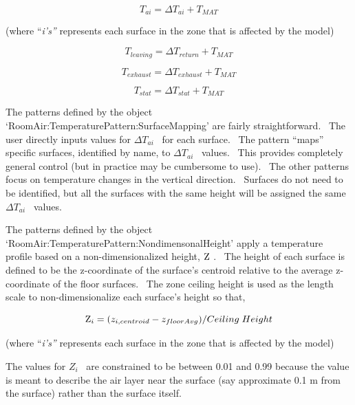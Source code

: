 \begin{equation}
{T_{ai}} = \Delta {T_{ai}} + {T_{MAT}}
\end{equation}

(where ``\emph{i's''} represents each surface in the zone that is affected by the model)

\begin{equation}
{T_{leaving}} = \Delta {T_{return}} + {T_{MAT}}
\end{equation}

\begin{equation}
{T_{exhaust}} = \Delta {T_{exhaust}} + {T_{MAT}}
\end{equation}

\begin{equation}
{T_{stat}} = \Delta {T_{stat}} + {T_{MAT}}
\end{equation}

The patterns defined by the object `RoomAir:TemperaturePattern:SurfaceMapping' are fairly straightforward.~ The user directly inputs values for \(\Delta {T_{ai}}\) ~for each surface.~ The pattern ``maps'' specific surfaces, identified by name, to \(\Delta {T_{ai}}\) ~values.~ This provides completely general control (but in practice may be cumbersome to use).~ The other patterns focus on temperature changes in the vertical direction.~ Surfaces do not need to be identified, but all the surfaces with the same height will be assigned the same \(\Delta {T_{ai}}\) ~values.

The patterns defined by the object `RoomAir:TemperaturePattern:NondimensonalHeight' apply a temperature profile based on a non-dimensionalized height, \({\rm Z}\) .~ The height of each surface is defined to be the z-coordinate of the surface's centroid relative to the average z-coordinate of the floor surfaces.~ The zone ceiling height is used as the length scale to non-dimensionalize each surface's height so that,

\begin{equation}
{{\rm Z}_i} = ({z_{i,centroid}} - {z_{floorAvg}})/Ceiling\;Height
\end{equation}

(where ``\emph{i's''} represents each surface in the zone that is affected by the model)

The values for \({Z_i}\) ~are constrained to be between 0.01 and 0.99 because the value is meant to describe the air layer near the surface (say approximate 0.1 m from the surface) rather than the surface itself.

